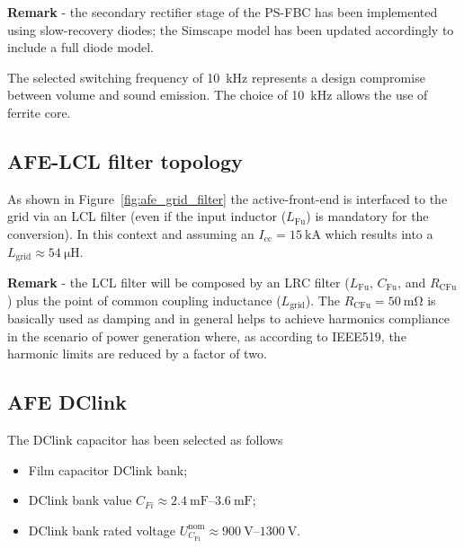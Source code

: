 \documentclass[12pt,a4paper]{scrartcl}
\begin{document}
\begin{onehalfspace}
\noindent\textbf{Remark} - the secondary rectifier stage of the PS-FBC has been implemented using
slow-recovery diodes; the Simscape model has been updated accordingly to
include a full diode model.

The selected switching frequency of \SI{10}{\kilo\hertz} represents a design compromise between volume and sound emission. The choice of \SI{10}{\kilo\hertz} allows the use of ferrite core.

%

\subsection{AFE-LCL filter topology}
As shown in Figure~\ref{fig:afe_grid_filter} the active-front-end is interfaced to the grid via an LCL filter (even if the input inductor ($L_\text{Fu}$) is mandatory for the conversion). In this context and assuming an $I_\text{cc}=\SI{15}{\kilo\ampere}$ which results into a $L_\text{grid} \approx\SI{54}{\micro\henry}$.

\noindent\textbf{Remark} - the LCL filter will be composed by an LRC filter ($L_\text{Fu}$, $C_\text{Fu}$, and $R_\text{CFu}$) plus the point of common coupling inductance ($L_\text{grid}$).
The $R_\text{CFu} = \SI{50}{\milli\ohm}$ is basically used as damping and in general helps to achieve harmonics compliance in the scenario of power generation where, as according to IEEE519, the harmonic limits are reduced by a factor of two.

\subsection{AFE DClink}
The DClink capacitor has been selected as follows
\begin{itemize}
	\item[--] Film capacitor DClink bank;
	\item[--] DClink bank value $C_{Fi} \approx \SI{2.4}{\milli\farad}–\SI{3.6}{\milli\farad}$;	
	\item[--] DClink bank rated voltage $U_{C_\text{Fi}}^\text{nom} \approx \SI{900}{\volt}–\SI{1300}{\volt}$.
\end{itemize}


\end{onehalfspace}
\end{document}
